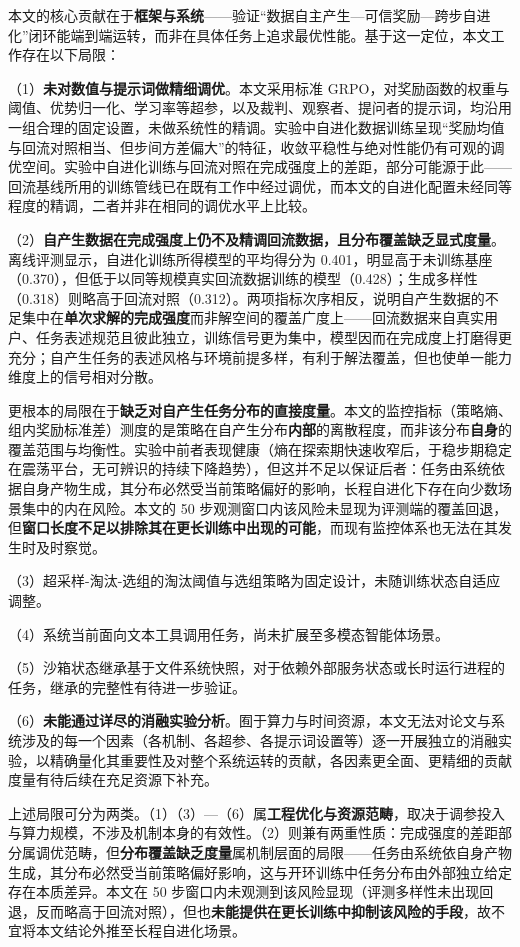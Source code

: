 本文的核心贡献在于\textbf{框架与系统}——验证“数据自主产生—可信奖励—跨步自进化”闭环能端到端运转，而非在具体任务上追求最优性能。基于这一定位，本文工作存在以下局限：

（1）\textbf{未对数值与提示词做精细调优}。本文采用标准 GRPO，对奖励函数的权重与阈值、优势归一化、学习率等超参，以及裁判、观察者、提问者的提示词，均沿用一组合理的固定设置，未做系统性的精调。实验中自进化数据训练呈现“奖励均值与回流对照相当、但步间方差偏大”的特征，收敛平稳性与绝对性能仍有可观的调优空间。实验中自进化训练与回流对照在完成强度上的差距，部分可能源于此——回流基线所用的训练管线已在既有工作中经过调优，而本文的自进化配置未经同等程度的精调，二者并非在相同的调优水平上比较。

（2）\textbf{自产生数据在完成强度上仍不及精调回流数据，且分布覆盖缺乏显式度量}。离线评测显示，自进化训练所得模型的平均得分为 0.401，明显高于未训练基座（0.370），但低于以同等规模真实回流数据训练的模型（0.428）；生成多样性（0.318）则略高于回流对照（0.312）。两项指标次序相反，说明自产生数据的不足集中在\textbf{单次求解的完成强度}而非解空间的覆盖广度上——回流数据来自真实用户、任务表述规范且彼此独立，训练信号更为集中，模型因而在完成度上打磨得更充分；自产生任务的表述风格与环境前提多样，有利于解法覆盖，但也使单一能力维度上的信号相对分散。

更根本的局限在于\textbf{缺乏对自产生任务分布的直接度量}。本文的监控指标（策略熵、组内奖励标准差）测度的是策略在自产生分布\textbf{内部}的离散程度，而非该分布\textbf{自身}的覆盖范围与均衡性。实验中前者表现健康（熵在探索期快速收窄后，于稳步期稳定在震荡平台，无可辨识的持续下降趋势），但这并不足以保证后者：任务由系统依据自身产物生成，其分布必然受当前策略偏好的影响，长程自进化下存在向少数场景集中的内在风险。本文的 50 步观测窗口内该风险未显现为评测端的覆盖回退，但\textbf{窗口长度不足以排除其在更长训练中出现的可能}，而现有监控体系也无法在其发生时及时察觉。

（3）超采样-淘汰-选组的淘汰阈值与选组策略为固定设计，未随训练状态自适应调整。

（4）系统当前面向文本工具调用任务，尚未扩展至多模态智能体场景。

（5）沙箱状态继承基于文件系统快照，对于依赖外部服务状态或长时运行进程的任务，继承的完整性有待进一步验证。

（6）\textbf{未能通过详尽的消融实验分析}。囿于算力与时间资源，本文无法对论文与系统涉及的每一个因素（各机制、各超参、各提示词设置等）逐一开展独立的消融实验，以精确量化其重要性及对整个系统运转的贡献，各因素更全面、更精细的贡献度量有待后续在充足资源下补充。

上述局限可分为两类。（1）（3）—（6）属\textbf{工程优化与资源范畴}，取决于调参投入与算力规模，不涉及机制本身的有效性。（2）则兼有两重性质：完成强度的差距部分属调优范畴，但\textbf{分布覆盖缺乏度量}属机制层面的局限——任务由系统依自身产物生成，其分布必然受当前策略偏好影响，这与开环训练中任务分布由外部独立给定存在本质差异。本文在 50 步窗口内未观测到该风险显现（评测多样性未出现回退，反而略高于回流对照），但也\textbf{未能提供在更长训练中抑制该风险的手段}，故不宜将本文结论外推至长程自进化场景。


